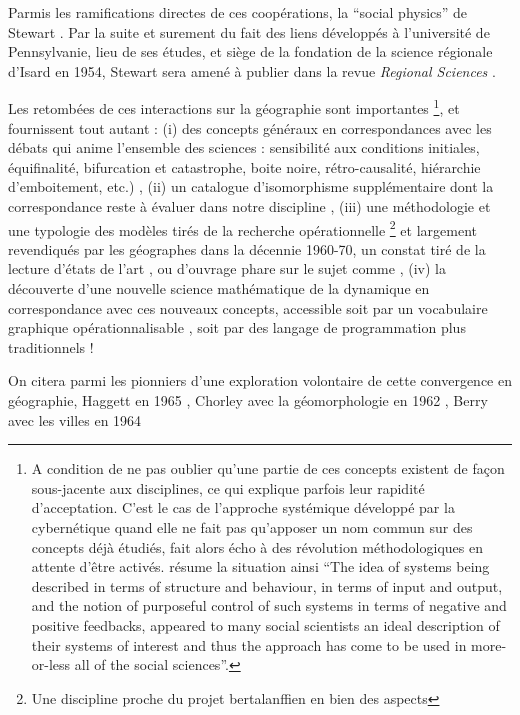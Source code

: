 {Parmis les ramifications directes de ces coopérations, la \enquote{social physics} de Stewart \autocite{Stewart1947}. Par la suite et surement du fait des liens développés à l'université de Pennsylvanie, lieu de ses études, et siège de la fondation de la science régionale d'Isard en 1954, Stewart sera amené à publier dans la revue \textit{Regional Sciences} \autocite{Stewart1958}.

Les retombées de ces interactions sur la géographie sont importantes \footnote{ A condition de ne pas oublier qu'une partie de ces concepts existent de façon sous-jacente aux disciplines, ce qui explique parfois leur rapidité d'acceptation. C'est le cas de l'approche systémique développé par la cybernétique quand elle ne fait pas qu'apposer un nom commun sur des concepts déjà étudiés, fait alors écho à des révolution méthodologiques en attente d'être activés. \textcite[5]{Batty1976} résume la situation ainsi \foreignquote{english}{The idea of systems being described in terms of structure and behaviour, in terms of input and output, and the notion of purposeful control of such systems in terms of negative and positive feedbacks, appeared to many social scientists an ideal description of their systems of interest and thus the approach has come to be used in more-or-less all of the social sciences}.}, et fournissent tout autant : (i) des concepts généraux en correspondances avec les débats qui anime l'ensemble des sciences : sensibilité aux conditions initiales, équifinalité, bifurcation et catastrophe, boite noire, rétro-causalité, hiérarchie d'emboitement, etc.) , (ii) un catalogue d'isomorphisme supplémentaire dont la correspondance reste à évaluer dans notre discipline \autocite{Wilson1969}, (iii)  une méthodologie et une typologie des modèles tirés de la recherche opérationnelle \autocite{Ackoff1962} \footnote{Une discipline proche du projet bertalanffien en bien des aspects} et largement revendiqués par les géographes dans la décennie 1960-70, un constat tiré de la lecture  d'états de l'art \autocite{Kohn1970}, ou d'ouvrage phare sur le sujet comme \autocite{Berry1964, Haggett1965}, (iv) la découverte d'une nouvelle science mathématique de la dynamique en correspondance avec ces nouveaux concepts, accessible soit par un vocabulaire graphique opérationnalisable \autocite{Forrester1961}, soit par des langage de programmation plus traditionnels !

On citera parmi les pionniers d'une exploration volontaire de cette convergence en géographie, Haggett en 1965 \autocite{Haggett1965}, Chorley avec la géomorphologie en 1962 \autocite{Chorley1962}, Berry avec les villes en 1964 \autocite{Berry1964}

}
